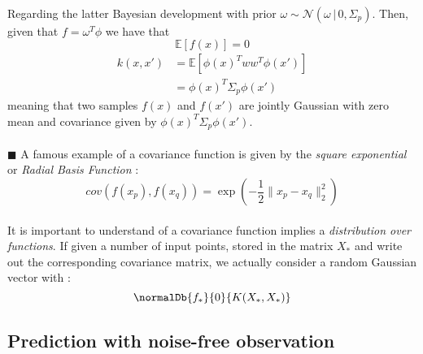\documentclass[a4paper]{article}
\begin{document}
{{			\paragraph{} Regarding the latter Bayesian development with prior $\omega\sim \mathcal{N}(\omega\, \vert \, 0, \Sigma_p)$. Then, given that $f = \omega^T \phi$ we have that 
			\begin{equation}
				\mathbb{E}\left[ f(x) \right] = 0
			\end{equation}
			\begin{equation}
				\begin{aligned}
					k(x,x') &= \mathbb{E}\left[ \phi(x)^T ww^T \phi(x')\right] \\
						  &= \phi(x)^T \Sigma_p \phi(x')
				\end{aligned}
			\end{equation}
		meaning that two samples $f(x)$ and $f(x')$ are jointly Gaussian with zero mean and covariance given by $\phi(x)^T \Sigma_p \phi(x')$. 
		
		\paragraph{} $\blacksquare$ A famous example of a covariance function is given by the \emph{square exponential} or \emph{Radial Basis Function} : 
		\begin{equation}
			cov(f(x_p),f(x_q)) = \exp{\left( -\frac{1}{2}\lVert x_p - x_q \lVert_2^2\right)}
		\end{equation}
		
		\paragraph{} It is important to understand of a covariance function implies a \emph{distribution over functions}. If given a number of input points, stored in the matrix $X_*$ and write out the corresponding covariance matrix, we actually consider a random Gaussian vector with : 
		\begin{equation}
			\normalDb{f_*}{0}{K(X_*,X_*)}
		\end{equation}
		}
		\subsection{Prediction with noise-free observation}
		{
}}
\end{document}
